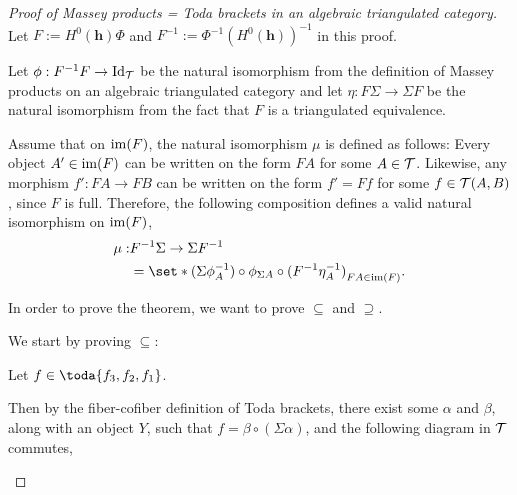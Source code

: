 \begin{proof}[Proof of Massey products = Toda brackets in an algebraic triangulated category]
    \phantom{hei}

    Let \( F := H^0(\mathbf{h}) \Phi \) and \( F^{-1} := \Phi^{-1} (H^0(\mathbf{h}))^{-1} \) in this proof.

    Let \( \phi: F^{-1} F \to \operatorname{Id}_{{\mathcal{T}}} \) be the natural isomorphism from the definition of Massey products on an algebraic triangulated category and let \( \eta: F \Sigma \to \Sigma F \) be the natural isomorphism from the fact that \( F \) is a triangulated equivalence.

    Assume that on \( \operatorname{im}(F) \), the natural isomorphism \( \mu \) is defined as follows: Every object \( A' \in \operatorname{im}(F) \) can be written on the form \( F A \) for some \( A \in {\mathcal{T}} \). Likewise, any morphism \( f': F A \to F B \) can be written on the form \( f' = F f \) for some \( f \in {\mathcal{T}}(A, B) \), since \( F \) is full. Therefore, the following composition defines a valid natural isomorphism on \( \operatorname{im}(F) \),
    \begin{align*}
        \mu: &F^{-1} \Sigma \to \Sigma F^{-1} \\
        &= \set*{ (\Sigma \phi^{-1}_A) \circ \phi_{\Sigma A} \circ (F^{-1} \eta^{-1}_A)}_{F A \in \im(F)}.
    \end{align*}

    In order to prove the theorem, we want to prove \( \subseteq \) and \( \supseteq \).

    We start by proving \( \subseteq \):
    
    Let \( f \in \toda{f_3, f_2, f_1} \).

    Then by the fiber-cofiber definition of Toda brackets, there exist some \( \alpha \) and \( \beta \), along with an object \( Y \), such that \( f = \beta \circ (\Sigma \alpha) \), and the following diagram in \( {\mathcal{T}} \) commutes,
    \begin{center}
\end{center}
\end{proof}
